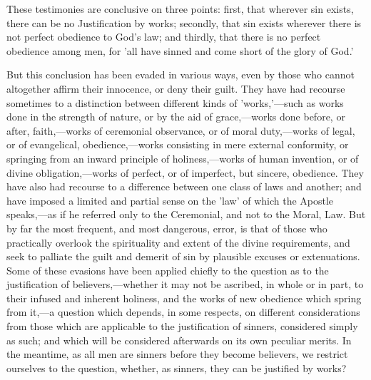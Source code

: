 \documentclass[
]{book}
\begin{document}
These testimonies are conclusive on three points: first, that wherever sin exists, there can be no Justification by works; secondly, that sin exists wherever there is not perfect obedience to God's law; and thirdly, that there is no perfect obedience among men, for 'all have sinned and come short of the glory of God.'

But this conclusion has been evaded in various ways, even by those who cannot altogether affirm their innocence, or deny their guilt. They have had recourse sometimes to a distinction between different kinds of 'works,'---such as works done in the strength of nature, or by the aid of grace,---works done before, or after, faith,---works of ceremonial observance, or of moral duty,---works of legal, or of evangelical, obedience,---works consisting in mere external conformity, or springing from an inward principle of holiness,---works of human invention, or of divine obligation,---works of perfect, or of imperfect, but sincere, obedience. They have also had recourse to a difference between one class of laws and another; and have imposed a limited and partial sense on the 'law' of which the Apostle speaks,---as if he referred only to the Ceremonial, and not to the Moral, Law. But by far the most frequent, and most dangerous, error, is that of those who practically overlook the spirituality and extent of the divine requirements, and seek to palliate the guilt and demerit of sin by plausible excuses or extenuations. Some of these evasions have been applied chiefly to the question as to the justification of believers,---whether it may not be ascribed, in whole or in part, to their infused and inherent holiness, and the works of new obedience which spring from it,---a question which depends, in some respects, on different considerations from those which are applicable to the justification of sinners, considered simply as such; and which will be considered afterwards on its own peculiar merits. In the meantime, as all men are sinners before they become believers, we restrict ourselves to the question, whether, as sinners, they can be justified by works?
\end{document}
